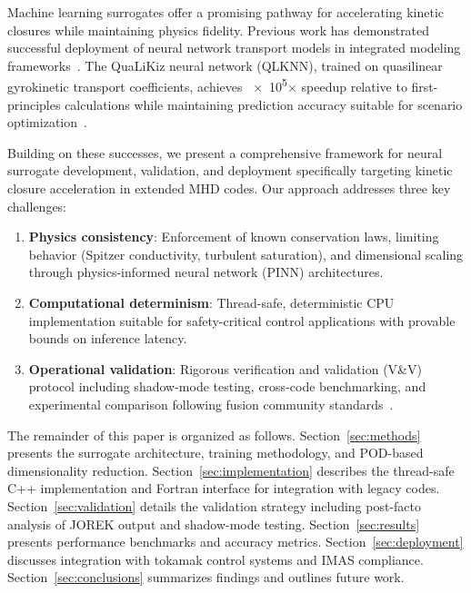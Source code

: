 \documentclass[12pt]{article}
\begin{document}
Machine learning surrogates offer a promising pathway for accelerating kinetic closures while maintaining physics fidelity. Previous work has demonstrated successful deployment of neural network transport models in integrated modeling frameworks~\cite{meneghini2017,citrin2015,vandemoolenaere2020}. The QuaLiKiz neural network (QLKNN), trained on quasilinear gyrokinetic transport coefficients, achieves \num{e5}$\times$ speedup relative to first-principles calculations while maintaining prediction accuracy suitable for scenario optimization~\cite{vandemoolenaere2020}.

Building on these successes, we present a comprehensive framework for neural surrogate development, validation, and deployment specifically targeting kinetic closure acceleration in extended MHD codes. Our approach addresses three key challenges:

\begin{enumerate}
\item \textbf{Physics consistency}: Enforcement of known conservation laws, limiting behavior (Spitzer conductivity, turbulent saturation), and dimensional scaling through physics-informed neural network (PINN) architectures.

\item \textbf{Computational determinism}: Thread-safe, deterministic CPU implementation suitable for safety-critical control applications with provable bounds on inference latency.

\item \textbf{Operational validation}: Rigorous verification and validation (V\&V) protocol including shadow-mode testing, cross-code benchmarking, and experimental comparison following fusion community standards~\cite{terry2008,greenwald2011}.
\end{enumerate}

The remainder of this paper is organized as follows. Section~\ref{sec:methods} presents the surrogate architecture, training methodology, and POD-based dimensionality reduction. Section~\ref{sec:implementation} describes the thread-safe C++ implementation and Fortran interface for integration with legacy codes. Section~\ref{sec:validation} details the validation strategy including post-facto analysis of JOREK output and shadow-mode testing. Section~\ref{sec:results} presents performance benchmarks and accuracy metrics. Section~\ref{sec:deployment} discusses integration with tokamak control systems and IMAS compliance. Section~\ref{sec:conclusions} summarizes findings and outlines future work.
\end{document}

